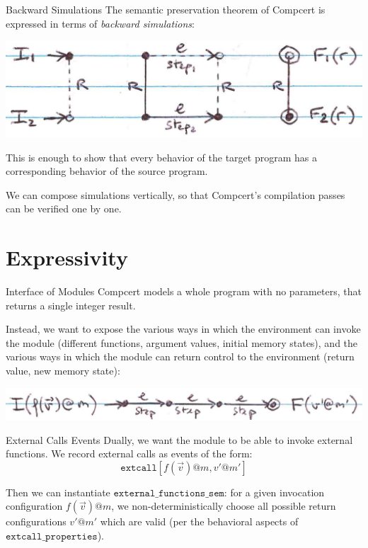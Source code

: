 \documentclass[handout]{beamer}
\newcommand{\kw}[1]{\texttt{#1}}
\begin{document}
\begin{frame}{Backward Simulations} %
The semantic preservation theorem of Compcert
is expressed in terms of \emph{backward simulations}:
\begin{center}
  \includegraphics[scale=.65]{figs/bwsim}
\end{center}
This is enough to show that every behavior of the target program
has a corresponding behavior of the source program.

We can compose simulations vertically,
so that Compcert's compilation passes
can be verified one by one.
\end{frame}

\section{Expressivity}

\begin{frame}{Interface of Modules} %
Compcert models a whole program with no parameters,
that returns a single integer result.

Instead, we want to expose the various ways in which
the environment can invoke the module
(different functions, argument values, initial memory states),
and the various ways in which the module can return
control to the environment
(return value, new memory state):
\begin{center}
  \includegraphics[scale=.65]{figs/comptrsys}
\end{center}
\end{frame}

\begin{frame}{External Calls Events} %
Dually, we want the module to be able to
invoke external functions.
We record external calls
as events of the form:
\[
  \kw{extcall}[f(\vec{v})@m, v'@m']
\]

Then we can instantiate
$\kw{external\_functions\_sem}$:
for a given invocation configuration $f(\vec{v})@m$,
we non-deterministically choose
all possible return configurations $v'@m'$
which are valid
(per the behavioral aspects of $\kw{extcall\_properties}$).
\end{frame}
\end{document}
